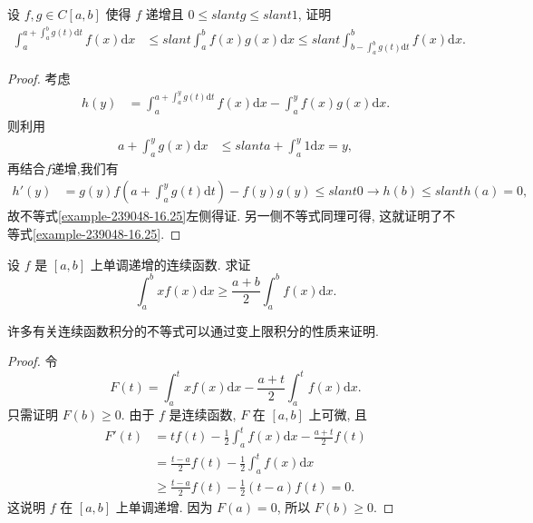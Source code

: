 \documentclass[../../main.tex]{subfiles}
\begin{document}
\begin{example}
设 $f,g \in C[a,b]$ 使得 $f$ 递增且 $0 \leqslant slant g \leqslant slant 1$, 证明
\begin{align}\label{example-239048-16.25}
\int_{a}^{a + \int_{a}^{b}g(t)\mathrm{d}t}f(x)\mathrm{d}x &\leqslant slant \int_{a}^{b}f(x)g(x)\mathrm{d}x \leqslant slant \int_{b - \int_{a}^{b}g(t)\mathrm{d}t}^{b}f(x)\mathrm{d}x.
\end{align}
\end{example}
\begin{proof}
考虑
\begin{align*}
h(y) &= \int_{a}^{a + \int_{a}^{y}g(t)\mathrm{d}t}f(x)\mathrm{d}x - \int_{a}^{y}f(x)g(x)\mathrm{d}x.
\end{align*}
则利用
\begin{align*}
a + \int_{a}^{y}g(x)\mathrm{d}x &\leqslant slant a + \int_{a}^{y}1\mathrm{d}x = y,
\end{align*}
再结合$f$递增,我们有
\begin{align*}
h'(y) &= g(y)f\left(a + \int_{a}^{y}g(t)\mathrm{d}t\right) - f(y)g(y) \leqslant slant 0 \to h(b) \leqslant slant h(a) = 0,
\end{align*}
故不等式\eqref{example-239048-16.25}左侧得证. 另一侧不等式同理可得, 这就证明了不等式\eqref{example-239048-16.25}. 
\end{proof}

\begin{proposition}
设 $f$ 是 $[a,b]$ 上单调递增的连续函数. 求证
$$\int_a^b xf(x)\mathrm{d}x\geqslant \frac{a+b}{2}\int_a^b f(x)\mathrm{d}x.$$
\end{proposition}
\begin{note}
许多有关连续函数积分的不等式可以通过变上限积分的性质来证明.
\end{note}
\begin{proof}
令
$$F(t)=\int_a^t xf(x)\mathrm{d}x-\frac{a+t}{2}\int_a^t f(x)\mathrm{d}x.$$
只需证明 $F(b)\geqslant 0$. 由于 $f$ 是连续函数, $F$ 在 $[a,b]$ 上可微, 且
$$
\begin{aligned}
F'(t) &= tf(t)-\frac{1}{2}\int_a^t f(x)\mathrm{d}x-\frac{a+t}{2}f(t) \\
&= \frac{t-a}{2}f(t)-\frac{1}{2}\int_a^t f(x)\mathrm{d}x \\
&\geqslant  \frac{t-a}{2}f(t)-\frac{1}{2}(t-a)f(t)=0.
\end{aligned}
$$
这说明 $f$ 在 $[a,b]$ 上单调递增. 因为 $F(a)=0$, 所以 $F(b)\geqslant 0$.
\end{proof}
\end{document}
